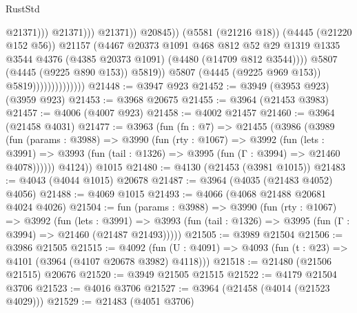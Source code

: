 \begin{lexlean}{RustStd}
\begin{coremodule}
{\begin{coremodule}
{{{{{{{{{{{{{{{{{{{{{{{{{{{{{{{{{{{{{{                                                          @21371)))
                                                    @21371)))
                                              @21371))
                                          @20845))
                                      (@5581 (@21216 @18))
                                      (@4445 (@21220 @152 @56))
                                      @21157
                                      (@4467
                                        @20373
                                        @1091
                                        @468
                                        @812
                                        @52
                                        @29
                                        @1319
                                        @1335
                                        @3544
                                        @4376
                                        (@4385 @20373 @1091)
                                        (@4480 (@14709 @812 @3544))))
                                    @5807
                                    (@4445 (@9225 @890 @153))
                                    @5819))
                                @5807
                                (@4445 (@9225 @969 @153))
                                @5819))))))))))))))
@21448 := @3947 @923
@21452 := @3949 (@3953 @923) (@3959 @923)
@21453 := @3968 @20675
@21455 := @3964 (@21453 @3983)
@21457 := @4006 (@4007 @923)
@21458 := @4002 @21457
@21460 := @3964 (@21458 @4031)
@21477 := @3963
    (fun (fn : @7) =>
    @21455
      (@3986
        (@3989
          (fun (params : @3988) =>
          @3990
            (fun (rty : @1067) =>
            @3992
              (fun (lets : @3991) =>
              @3993 (fun (tail : @1326) => @3995 (fun (Γ : @3994) => @21460 @4078))))))
        @4124))
    @1015
@21480 := @4130 (@21453 (@3981 @1015))
@21483 := @4043 (@4044 @1015) @20678
@21487 := @3964 (@4035 (@21483 @4052) @4056)
@21488 := @4069 @1015
@21493 := @4066 (@4068 @21488 @20681 @4024 @4026)
@21504 := fun (params : @3988) =>
  @3990
    (fun (rty : @1067) =>
    @3992
      (fun (lets : @3991) =>
      @3993 (fun (tail : @1326) => @3995 (fun (Γ : @3994) => @21460 (@21487 @21493)))))
@21505 := @3989 @21504
@21506 := @3986 @21505
@21515 := @4092
    (fun (U : @4091) => @4093 (fun (t : @23) => @4101 (@3964 (@4107 @20678 @3982) @4118)))
@21518 := @21480 (@21506 @21515) @20676
@21520 := @3949 @21505 @21515
@21522 := @4179 @21504 @3706
@21523 := @4016 @3706
@21527 := @3964 (@21458 (@4014 (@21523 @4029)))
@21529 := @21483 (@4051 @3706)
}}}}}}}}}}}}}}}}}}}}}}}}}}}}}}}}}}}}}}
\end{coremodule}}
\end{coremodule}
\end{lexlean}
